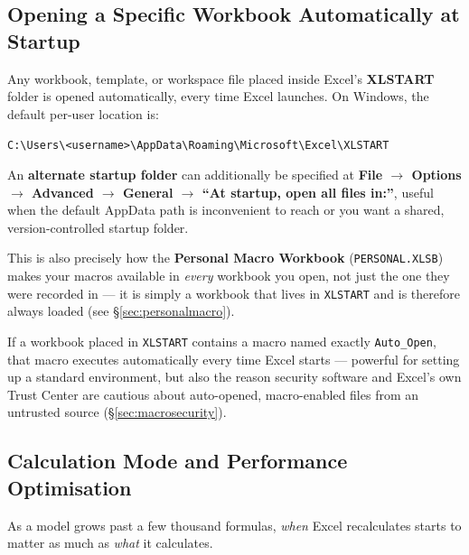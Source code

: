 \documentclass[11pt,a4paper]{article}
\begin{document}
\subsection{Opening a Specific Workbook Automatically at Startup}
\label{sec:xlstart}

\begin{formulasyntax}
Any workbook, template, or workspace file placed inside Excel's \textbf{XLSTART} folder is opened automatically, every time Excel launches. On Windows, the default per-user location is:
\begin{center}
\texttt{C:\textbackslash Users\textbackslash\textless username\textgreater\textbackslash AppData\textbackslash Roaming\textbackslash Microsoft\textbackslash Excel\textbackslash XLSTART}
\end{center}
An \textbf{alternate startup folder} can additionally be specified at \textbf{File $\rightarrow$ Options $\rightarrow$ Advanced $\rightarrow$ General $\rightarrow$ ``At startup, open all files in:''}, useful when the default AppData path is inconvenient to reach or you want a shared, version-controlled startup folder.
\end{formulasyntax}

This is also precisely how the \textbf{Personal Macro Workbook} (\texttt{PERSONAL.XLSB}) makes your macros available in \emph{every} workbook you open, not just the one they were recorded in --- it is simply a workbook that lives in \texttt{XLSTART} and is therefore always loaded (see \S\ref{sec:personalmacro}).

\begin{pitfall}
If a workbook placed in \texttt{XLSTART} contains a macro named exactly \texttt{Auto\_Open}, that macro executes automatically every time Excel starts --- powerful for setting up a standard environment, but also the reason security software and Excel's own Trust Center are cautious about auto-opened, macro-enabled files from an untrusted source (\S\ref{sec:macrosecurity}).
\end{pitfall}

\subsection{Calculation Mode and Performance Optimisation}
\label{sec:calcmode}

As a model grows past a few thousand formulas, \emph{when} Excel recalculates starts to matter as much as \emph{what} it calculates.
\end{document}
